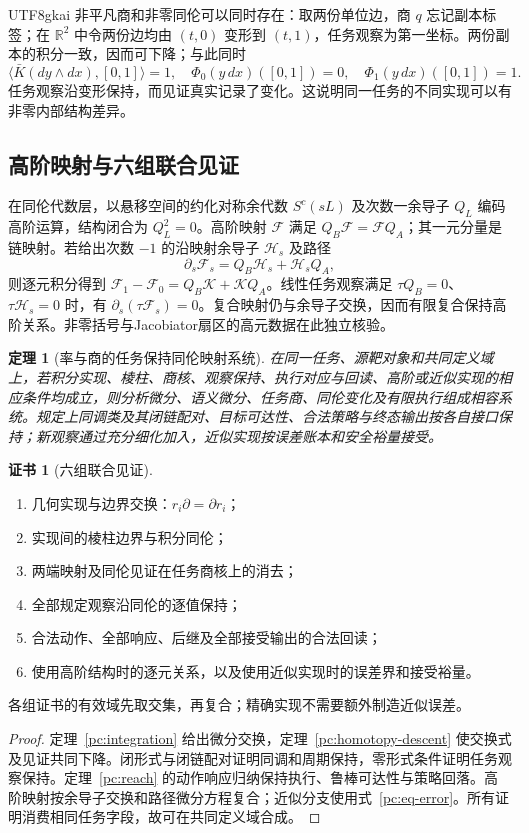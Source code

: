 \documentclass[11pt,a4paper]{article}
\theoremstyle{plain}
\newtheorem{theorem}{定理}[section]
\theoremstyle{definition}
\newtheorem*{certificate}{证书}
\theoremstyle{remark}
\begin{document}
\begin{CJK*}{UTF8}{gkai}
非平凡商和非零同伦可以同时存在：取两份单位边，商 $q$ 忘记副本标签；在 $\mathbb R^2$ 中令两份边均由 $(t,0)$ 变形到 $(t,1)$，任务观察为第一坐标。两份副本的积分一致，因而可下降；与此同时
\[
 \langle\bar K(dy\wedge dx),[0,1]\rangle=1,
 \quad \Phi_0(y\,dx)([0,1])=0,
 \quad \Phi_1(y\,dx)([0,1])=1.
\]
任务观察沿变形保持，而见证真实记录了变化。这说明同一任务的不同实现可以有非零内部结构差异。

\subsection{高阶映射与六组联合见证}

在同伦代数层，以悬移空间的约化对称余代数 $S^c(sL)$ 及次数一余导子 $Q_L$ 编码高阶运算，结构闭合为 $Q_L^2=0$。高阶映射 $\mathcal F$ 满足 $Q_B\mathcal F=\mathcal FQ_A$；其一元分量是链映射。若给出次数 $-1$ 的沿映射余导子 $\mathcal H_s$ 及路径
\[
 \partial_s\mathcal F_s=Q_B\mathcal H_s+\mathcal H_sQ_A,
\]
则逐元积分得到 $\mathcal F_1-\mathcal F_0=Q_B\mathcal K+\mathcal KQ_A$。线性任务观察满足 $\tau Q_B=0$、$\tau\mathcal H_s=0$ 时，有 $\partial_s(\tau\mathcal F_s)=0$。复合映射仍与余导子交换，因而有限复合保持高阶关系。非零括号与Jacobiator扇区的高元数据在此独立核验。

\begin{theorem}[率与商的任务保持同伦映射系统]
\label{pc:comparison-main}
在同一任务、源靶对象和共同定义域上，若积分实现、棱柱、商核、观察保持、执行对应与回读、高阶或近似实现的相应条件均成立，则分析微分、语义微分、任务商、同伦变化及有限执行组成相容系统。规定上同调类及其闭链配对、目标可达性、合法策略与终态输出按各自接口保持；新观察通过充分细化加入，近似实现按误差账本和安全裕量接受。
\end{theorem}
\begin{certificate}[六组联合见证]
\begin{enumerate}
 \item 几何实现与边界交换：$r_i\partial=\partial r_i$；
 \item 实现间的棱柱边界与积分同伦；
 \item 两端映射及同伦见证在任务商核上的消去；
 \item 全部规定观察沿同伦的逐值保持；
 \item 合法动作、全部响应、后继及全部接受输出的合法回读；
 \item 使用高阶结构时的逐元关系，以及使用近似实现时的误差界和接受裕量。
\end{enumerate}
各组证书的有效域先取交集，再复合；精确实现不需要额外制造近似误差。
\end{certificate}
\begin{proof}
定理~\ref{pc:integration} 给出微分交换，定理~\ref{pc:homotopy-descent} 使交换式及见证共同下降。闭形式与闭链配对证明同调和周期保持，零形式条件证明任务观察保持。定理~\ref{pc:reach} 的动作响应归纳保持执行、鲁棒可达性与策略回落。高阶映射按余导子交换和路径微分方程复合；近似分支使用式~\eqref{pc:eq-error}。所有证明消费相同任务字段，故可在共同定义域合成。
\end{proof}


\end{CJK*}
\end{document}
